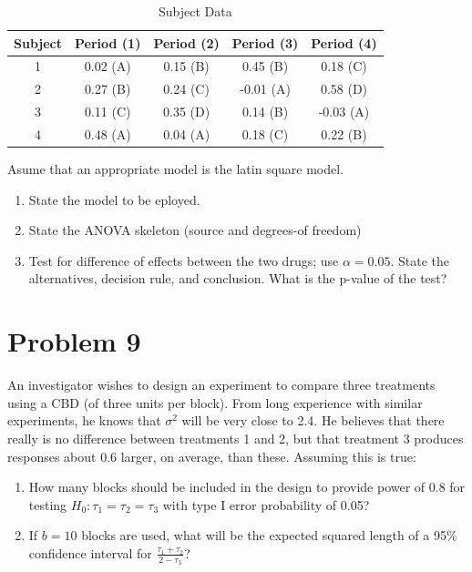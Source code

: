 \documentclass{article}
\begin{document}
\begin{table}[!ht]
	\centering
	\caption{Subject Data}
	\begin{tabular}{c c c c c}
		\hline
		\textbf{Subject} & \textbf{Period (1)} & \textbf{Period (2)} & \textbf{Period (3)} & \textbf{Period (4)} \\
		\hline
		1                & 0.02 (A)            & 0.15 (B)            & 0.45 (B)            & 0.18 (C)            \\
		2                & 0.27 (B)            & 0.24 (C)            & -0.01 (A)           & 0.58 (D)            \\
		3                & 0.11 (C)            & 0.35 (D)            & 0.14 (B)            & -0.03 (A)           \\
		4                & 0.48 (A)            & 0.04 (A)            & 0.18 (C)            & 0.22 (B)            \\
		\hline
	\end{tabular}
\end{table}
Asume that an appropriate model is the latin square model.
\begin{enumerate}
	\item State the model to be eployed.
	\item State the ANOVA skeleton (source and degrees-of freedom)
	\item Test for difference of effects between the two drugs; use $\alpha =0.05$. State the alternatives,
	      decision rule, and conclusion. What is the p-value of the test?
\end{enumerate}

\section{Problem 9}
An investigator wishes to design an experiment to compare three treatments using a CBD (of three
units per block). From long experience with similar experiments, he knows that $\sigma^2$ will be very
close to 2.4. He believes that there really is no difference between treatments 1 and 2, but that
treatment 3 produces responses about 0.6 larger, on average, than these. Assuming this is true:

\begin{enumerate}
	\item How many blocks should be included in the design to provide power of 0.8 for testing
	      $H_0: \tau_1 = \tau_2 = \tau_3$ with type I error probability of 0.05?
	\item If $b=10$ blocks are used, what will be the expected squared length of a 95\% confidence interval
	      for $\frac{\tau_1 + \tau_2}{2-\tau_3}$?
\end{enumerate}
\end{document}
